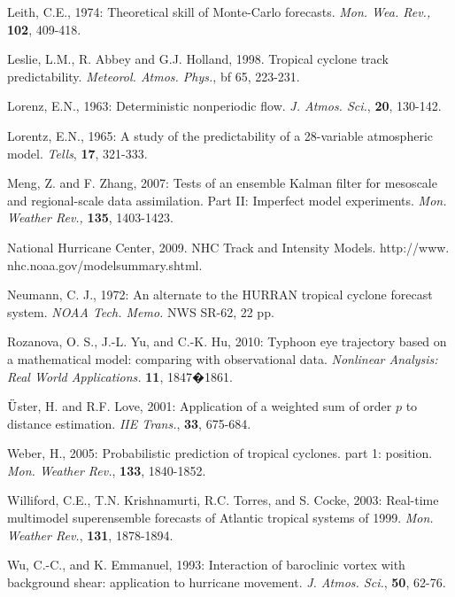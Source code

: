 \documentclass[a4paper, 12pt]{article}
\begin{document}
{\begin{list}{}{\leftmargin=1em \itemindent=-2em}
\item Leith, C.E., 1974: Theoretical skill of Monte-Carlo forecasts. \emph{Mon. Wea. Rev.,} {\bf 102}, 409-418.

\item Leslie, L.M., R. Abbey and G.J. Holland, 1998. Tropical cyclone track predictability. \emph{Meteorol. Atmos. Phys.}, {bf 65}, 223-231.

\item Lorenz, E.N., 1963: Deterministic nonperiodic flow. \emph{J. Atmos. Sci.}, {\bf 20}, 130-142.
\item Lorentz, E.N., 1965: A study of the predictability of a 28-variable atmospheric model. \emph{Tells}, {\bf 17}, 321-333.

\item Meng, Z. and F. Zhang, 2007: Tests of an ensemble Kalman filter for mesoscale and regional-scale data assimilation. Part II: Imperfect model experiments. \emph{Mon. Weather Rev.,} {\bf 135}, 1403-1423.

    \item National Hurricane Center, 2009. NHC Track and Intensity Models. http://www. nhc.noaa.gov/modelsummary.shtml.

\item Neumann, C. J., 1972: An alternate to the HURRAN tropical cyclone forecast system. \emph{NOAA Tech. Memo.} NWS SR-62, 22 pp.

\item  Rozanova, O. S., J.-L. Yu, and C.-K. Hu, 2010: Typhoon eye trajectory based on a mathematical model: comparing
with observational data. \emph{Nonlinear Analysis: Real World Applications.} {\bf 11}, 1847�1861.

\item $\ddot{\textup{U}}$ster, H. and R.F. Love, 2001: Application of a weighted sum of order $p$ to distance estimation. \emph{IIE Trans.}, {\bf 33}, 675-684.

\item Weber, H., 2005: Probabilistic prediction of tropical cyclones. part 1: position. \emph{Mon. Weather Rev.}, {\bf 133}, 1840-1852.

\item Williford, C.E., T.N. Krishnamurti, R.C. Torres, and S. Cocke, 2003: Real-time multimodel superensemble forecasts of Atlantic tropical systems of 1999. \emph{Mon. Weather Rev.}, {\bf 131}, 1878-1894.

\item Wu, C.-C., and K. Emmanuel, 1993: Interaction of baroclinic vortex with background shear: application to hurricane movement. \emph{J. Atmos. Sci.}, {\bf 50}, 62-76.


\end{list}}
\end{document}
